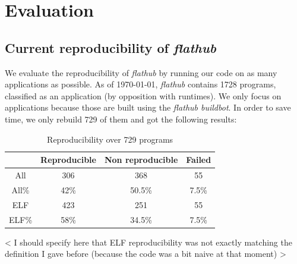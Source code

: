 \documentclass[a4paper,11pt,oneside]{report}
\theoremstyle{definition}
\newcommand{\fh}{\emph{flathub}\xspace}
\newcommand{\fhbb}{\emph{flathub buildbot}\xspace}
\begin{document}
\chapter{Evaluation}

\section{Current reproducibility of \fh}
We evaluate the reproducibility of \fh by running our code on as many
applications as possible. As of \today, \fh contains 1728 programs, classified
as an application (by opposition with runtimes). We only focus on applications
because those are built using the \fhbb. In order to save time, we only rebuild
729 of them and got the following results:

\begin{table}[h]
    \centering
        \begin{tabular}{|c|c|c|c|}
            \hline
            & Reproducible & Non reproducible & Failed\\
            \hline
            All & 306 & 368 & 55\\
            \hline
            All\% & 42\% & 50.5\% & 7.5\% \\
            \hline
            ELF & 423 & 251 & 55\\
            \hline
            ELF\% & 58\% & 34.5\% & 7.5\% \\
            \hline
        \end{tabular}
    \caption{Reproducibility over 729 programs}
    \label{tab:rebuild-all}
\end{table}

< I should specify here that ELF reproducibility was not exactly matching the definition I gave before (because the code was a bit naive at that moment) >
\end{document}
